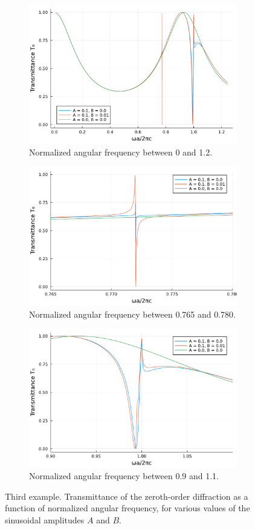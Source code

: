 \documentclass[reprint,amsmath,amssymb,
 aps]{revtex4-2}
\begin{document}
\begin{figure}[h!]
\begin{subfigure}{.5\textwidth}
\includegraphics[width=0.6\columnwidth]{figures/ex4_bic_v1.pdf}
  \caption{Normalized angular frequency between 0 and 1.2.}
\label{fig:ex4_bic_v1}
\end{subfigure}
\begin{subfigure}{.5\textwidth}
\includegraphics[width=0.6\columnwidth]{figures/ex4_bic_v2.pdf}
  \caption{Normalized angular frequency between 0.765 and 0.780.}
\label{fig:ex4_bic_v2}
\end{subfigure}
\begin{subfigure}{.5\textwidth}
\includegraphics[width=0.6\columnwidth]{figures/ex4_bic_v3.pdf}
  \caption{Normalized angular frequency between 0.9 and 1.1.}
\label{fig:ex4_bic_v3}
\end{subfigure}
\caption{Third example. Transmittance of the zeroth-order diffraction as a function of normalized angular frequency, for various values of the sinusoidal amplitudes $A$ and $B$.}
\label{fig:ex4_bic}
\end{figure}
\end{document}
